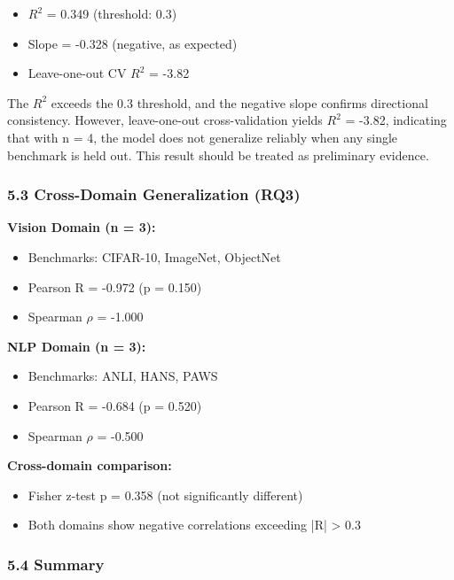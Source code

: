 \begin{itemize}
\item $R^2$ = 0.349 (threshold: 0.3)
\item Slope = -0.328 (negative, as expected)
\item Leave-one-out CV $R^2$ = -3.82
\end{itemize}

The $R^2$ exceeds the 0.3 threshold, and the negative slope confirms directional consistency. However, leave-one-out cross-validation yields $R^2$ = -3.82, indicating that with n = 4, the model does not generalize reliably when any single benchmark is held out. This result should be treated as preliminary evidence.

\subsubsection{5.3 Cross-Domain Generalization (RQ3)}

\textbf{Vision Domain (n = 3):}
\begin{itemize}
\item Benchmarks: CIFAR-10, ImageNet, ObjectNet
\item Pearson R = -0.972 (p = 0.150)
\item Spearman $\rho$ = -1.000
\end{itemize}

\textbf{NLP Domain (n = 3):}
\begin{itemize}
\item Benchmarks: ANLI, HANS, PAWS
\item Pearson R = -0.684 (p = 0.520)
\item Spearman $\rho$ = -0.500
\end{itemize}

\textbf{Cross-domain comparison:}
\begin{itemize}
\item Fisher z-test p = 0.358 (not significantly different)
\item Both domains show negative correlations exceeding |R| > 0.3
\end{itemize}

\subsubsection{5.4 Summary}

\begin{table}[htbp]
\centering
{}
\end{table}
